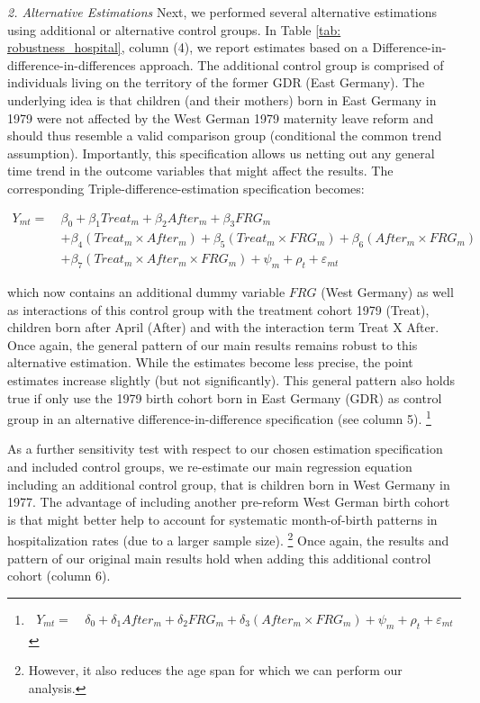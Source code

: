 \documentclass[11pt, a4paper]{article} %
\begin{document}
\textit{2. Alternative Estimations}\newline
Next, we performed several alternative estimations using additional or alternative control groups. In Table \ref{tab: robustness_hospital}, column (4), we report estimates based on a Difference-in-difference-in-differences approach. The additional control group is comprised of individuals living on the territory of the former GDR (East Germany). The underlying idea is that children (and their mothers) born in East Germany in 1979 were not affected by the West German 1979 maternity leave reform and should thus resemble a valid comparison group (conditional the common trend assumption). Importantly, this specification allows us netting out any general time trend in the outcome variables that might affect the results. The corresponding Triple-difference-estimation specification becomes: \newline


\begin{align}
Y_{mt} =\ &\beta_0 + \beta_1 Treat_{m} + \beta_2 After_{m} + \beta_3 FRG_m \nonumber\\&+ \beta_4 (Treat_{m} \times After_{m}) + \beta_5 (Treat_m \times FRG_m) + \beta_6 (After_m \times FRG_m) \nonumber\\ &+ \beta_7 (Treat_m\times After_m\times FRG_m) + \psi_m + \rho_t + \varepsilon_{mt} \label{eq:DDD}
\end{align}

which now contains an additional dummy variable $FRG$ (West Germany) as well as interactions of this control group with the treatment cohort 1979 (Treat), children born after April (After) and with the interaction term Treat X After. Once again, the general pattern of our main results remains robust to this alternative estimation. While the estimates become less precise, the point estimates increase slightly (but not significantly).  This general pattern also holds true if only use the 1979 birth cohort born in East Germany (GDR) as control group in an alternative difference-in-difference specification (see column 5). \footnote{
\begin{align}
Y_{mt} =\ &\delta_0 +  \delta_1 After_{m} + \delta_2 FRG_m + \delta_3 (After_m \times FRG_m) + \psi_m + \rho_t + \varepsilon_{mt} \label{eq:alt_DD}
\end{align}
}

As a further sensitivity test with respect to our chosen estimation specification and included control groups, we re-estimate our main regression equation including an additional control group, that is children born in West Germany in 1977. The advantage of including another pre-reform West German birth cohort is that might better help to account for systematic month-of-birth patterns in hospitalization rates (due to a larger sample size). \footnote{However, it also reduces the age span for which we can perform our analysis.}
Once again, the results and pattern of our original main results hold when adding this additional control cohort (column 6).\newline
\end{document}
